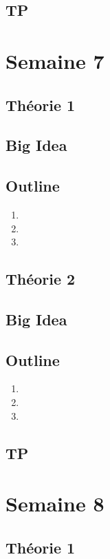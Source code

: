 \documentclass{article}
\begin{document}
\subsection{TP}

\pagebreak
\section{Semaine 7}
\subsection{Théorie 1}
\subsection*{Big Idea}
\subsection*{Outline}
    \begin{enumerate}
    \item
    \item
    \item
    \end{enumerate}
\subsection{Théorie 2}
\subsection*{Big Idea}
\subsection*{Outline}
    \begin{enumerate}
    \item
    \item
    \item
    \end{enumerate}
\subsection{TP}

\pagebreak
\section{Semaine 8}
\subsection{Théorie 1}
\end{document}
